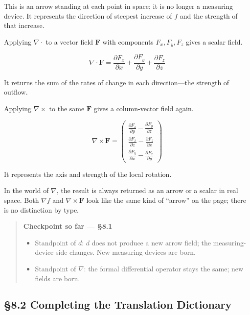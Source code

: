 \documentclass[a4paper,12pt,openany]{book}
\begin{document}
This is an arrow standing at each point in space; it is no longer a
measuring device. It represents the direction of steepest increase of
\(f\) and the strength of that increase.

Applying \(\nabla\cdot\) to a vector field \(\mathbf{F}\) with
components \(F_x,F_y,F_z\) gives a scalar field.

\[\nabla \cdot \mathbf{F} = \frac{\partial F_x}{\partial x} + \frac{\partial F_y}{\partial y} + \frac{\partial F_z}{\partial z}\]

It returns the sum of the rates of change in each direction—the
strength of outflow.

Applying \(\nabla\times\) to the same \(\mathbf{F}\) gives a
column-vector field again.

\[\nabla \times \mathbf{F} = \begin{pmatrix} \frac{\partial F_z}{\partial y} - \frac{\partial F_y}{\partial z} \\[0.3em] \frac{\partial F_x}{\partial z} - \frac{\partial F_z}{\partial x} \\[0.3em] \frac{\partial F_y}{\partial x} - \frac{\partial F_x}{\partial y} \end{pmatrix}\]

It represents the axis and strength of the local rotation.

In the world of \(\nabla\), the result is always returned as an arrow or
a scalar in real space. Both \(\nabla f\) and \(\nabla\times\mathbf{F}\)
look like the same kind of ``arrow'' on the page; there is no
distinction by type.

\begin{quote}
\textbf{Checkpoint so far — §8.1}

\begin{itemize}
\item
  Standpoint of \(d\): \(d\) does not produce a new arrow field; the
  measuring-device side changes. New measuring devices are born.
\item
  Standpoint of \(\nabla\): the formal differential operator stays the
  same; new fields are born.
\end{itemize}
\end{quote}

\par\vspace{0.35em}\par

\hypertarget{completing-the-translation-dictionary}{%
\subsection{§8.2 Completing the Translation
Dictionary}\label{completing-the-translation-dictionary}}
\end{document}
